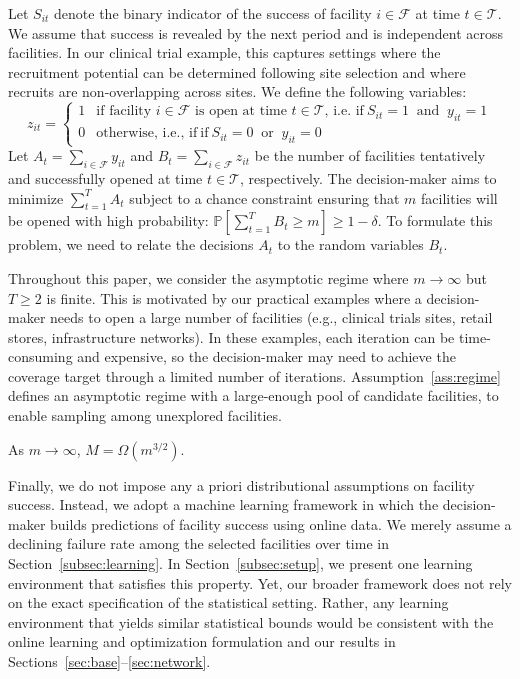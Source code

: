 \documentclass[nonblindrev]{informs3noheader}
\def\P{\mathbb{P}}
\def\calF{\mathcal{F}}
\def\calT{\mathcal{T}}
\begin{document}
Let $S_{it}$ denote the binary indicator of the success of facility $i\in\calF$ at time $t\in\calT$. We assume that success is revealed by the next period and is independent across facilities. In our clinical trial example, this captures settings where the recruitment potential can be determined following site selection and where recruits are non-overlapping across sites. We define the following variables:
\begin{equation}\label{eq:z}
    z_{it} = \begin{cases}
        1 & \text{if facility $i\in\calF$ is open at time $t\in\calT$, i.e. if}\ S_{it} = 1 \;\; \text{and}\;\; y_{it}=1\\ 
        0 & \text{otherwise, i.e., if}\ \text{if}\ S_{it} = 0 \;\; \text{or}\;\; y_{it}=0
    \end{cases}
\end{equation}
Let $A_t=\sum_{i\in\calF}y_{it}$ and $B_t=\sum_{i\in\calF}z_{it}$ be the number of facilities tentatively and successfully opened at time $t\in\calT$, respectively. The decision-maker aims to minimize $\sum_{t=1}^T A_t$ subject to a chance constraint ensuring that $m$ facilities will be opened with high probability: $\P\left[\sum_{t=1}^TB_t\geq m\right]\geq1-\delta$. To formulate this problem, we need to relate the decisions $A_t$ to the random variables $B_t$.

Throughout this paper, we consider the asymptotic regime where $m\to\infty$ but $T\geq2$ is finite. This is motivated by our practical examples where a decision-maker needs to open a large number of facilities (e.g., clinical trials sites, retail stores, infrastructure networks). In these examples, each iteration can be time-consuming and expensive, so the decision-maker may need to achieve the coverage target through a limited number of iterations. Assumption~\ref{ass:regime} defines an asymptotic regime with a large-enough pool of candidate facilities, to enable sampling among unexplored facilities.
\begin{assumption}
    \label{ass:regime}
   As $m \to \infty$, $M=\Omega(m^{3/2})$.
\end{assumption}

Finally, we do not impose any a priori distributional assumptions on facility success. Instead, we adopt a machine learning framework in which the decision-maker builds predictions of facility success using online data. We merely assume a declining failure rate among the selected facilities over time in Section~\ref{subsec:learning}. In Section~\ref{subsec:setup}, we present one learning environment that satisfies this property. Yet, our broader framework does not rely on the exact specification of the statistical setting. Rather, any learning environment that yields similar statistical bounds would be consistent with the online learning and optimization formulation and our results in Sections~\ref{sec:base}--\ref{sec:network}.
\end{document}
